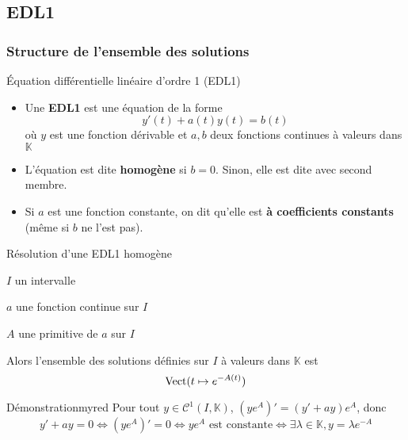 \subsection{EDL1}

    \subsubsection{Structure de l’ensemble des solutions}

    \begin{defi}{Équation différentielle linéaire d’ordre 1 (EDL1)}{}
	    \begin{itemize}
		    \item Une \textbf{EDL1} est une équation de la forme 
            \[ y'(t) + a(t)y(t) = b(t)\]
             où $y$ est une fonction dérivable et $a,b$ deux fonctions continues à valeurs dans $\mathbb{K}$
		    \item L’équation est dite \textbf{homogène} si $b = 0$. Sinon, elle est dite avec second membre.
		    \item Si $a$ est une fonction constante, on dit qu’elle est \textbf{à coefficients constants} (même si $b$ ne l’est pas).
	    \end{itemize}
    \end{defi}

    \begin{theo}{Résolution d’une EDL1 homogène}{}
        \begin{soient}
            \item $I$ un intervalle
            \item $a$ une fonction continue sur $I$
            \item $A$ une primitive de $a$ sur $I$
        \end{soient}
        Alors l’ensemble des solutions définies sur $I$ à valeurs dans $\mathbb{K}$ est 
        \[ \operatorname{Vect}(t \mapsto e^{-A(t)}) \]
    \end{theo}

    \begin{demo}{Démonstration}{myred}
        Pour tout $y \in \mathcal{C}^1(I,\mathbb{K})$, $\left(ye^A\right)' = \left(y' + ay\right)e^A$, donc 
        \[ y' +ay = 0 \iff \left(ye^A\right)' = 0 \iff ye^A \text{ est constante} \iff \exists \lambda \in \mathbb{K}, y = \lambda e^{-A} \] 
    \end{demo}

